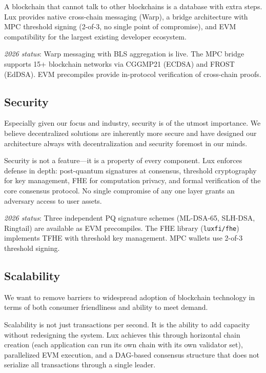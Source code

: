 \documentclass[11pt,a4paper]{article}
\begin{document}
A blockchain that cannot talk to other blockchains is a database with
extra steps. Lux provides native cross-chain messaging (Warp), a
bridge architecture with MPC threshold signing (2-of-3, no single
point of compromise), and EVM compatibility for the largest existing
developer ecosystem.

\medskip\noindent\textit{2026 status}: Warp messaging with BLS
aggregation is live. The MPC bridge supports 15+ blockchain networks
via CGGMP21 (ECDSA) and FROST (EdDSA). EVM precompiles provide
in-protocol verification of cross-chain proofs.

\subsection{Security}

Especially given our focus and industry, security is of the utmost
importance. We believe decentralized solutions are inherently more
secure and have designed our architecture always with decentralization
and security foremost in our minds.

Security is not a feature---it is a property of every component. Lux
enforces defense in depth: post-quantum signatures at consensus,
threshold cryptography for key management, FHE for computation privacy,
and formal verification of the core consensus protocol. No single
compromise of any one layer grants an adversary access to user assets.

\medskip\noindent\textit{2026 status}: Three independent PQ signature
schemes (ML-DSA-65, SLH-DSA, Ringtail) are available as EVM
precompiles. The FHE library (\texttt{luxfi/fhe}) implements TFHE with
threshold key management. MPC wallets use 2-of-3 threshold signing.

\subsection{Scalability}

We want to remove barriers to widespread adoption of blockchain
technology in terms of both consumer friendliness and ability to
meet demand.

Scalability is not just transactions per second. It is the ability to
add capacity without redesigning the system. Lux achieves this through
horizontal chain creation (each application can run its own chain with
its own validator set), parallelized EVM execution, and a DAG-based
consensus structure that does not serialize all transactions through a
single leader.
\end{document}
